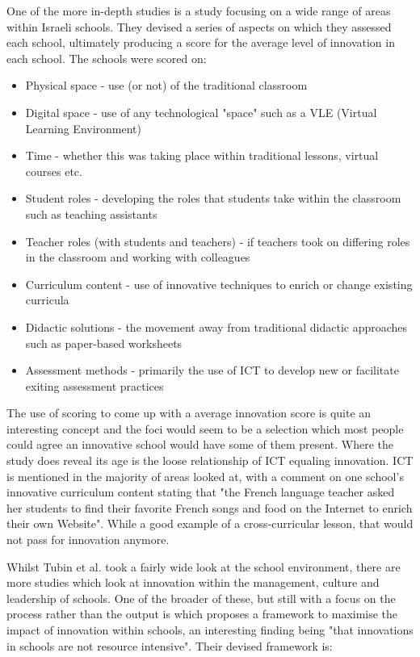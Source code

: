 One of the more in-depth studies is a study focusing on a wide range of areas within Israeli schools. \cite{tubin2003domains} They devised a series of aspects on which they assessed each school, ultimately producing a score for the average level of innovation in each school. The schools were scored on:

\begin{itemize}
\item Physical space - use (or not) of the traditional classroom
\item Digital space - use of any technological "space" such as a VLE (Virtual Learning Environment)
\item Time - whether this was taking place within traditional lessons, virtual courses etc.
\item Student roles - developing the roles that students take within the classroom such as teaching assistants
\item Teacher roles (with students and teachers) - if teachers took on differing roles in the classroom and working with colleagues
\item Curriculum content - use of innovative techniques to enrich or change existing curricula
\item Didactic solutions - the movement away from traditional didactic approaches such as paper-based worksheets
\item Assessment methods - primarily the use of ICT to develop new or facilitate exiting assessment practices
\end{itemize}

The use of scoring to come up with a average innovation score is quite an interesting concept and the foci would seem to be a selection which most people could agree an innovative school would have some of them present. Where the study does reveal its age is the loose relationship of ICT equaling innovation. ICT is mentioned in the majority of areas looked at, with a comment on one school's innovative curriculum content stating that "the French language teacher asked her students to find their favorite French songs and food on the Internet to enrich their own Website". While a good example of a cross-curricular lesson, that would not pass for innovation anymore.

Whilst Tubin et al. took a fairly wide look at the school environment, there are more studies which look at innovation within the management, culture and leadership of schools. One of the broader of these, but still with a focus on the process rather than the output is \cite{Sharma_2005} which proposes a framework to maximise the impact of innovation within schools, an interesting finding being "that innovations in schools are not resource intensive". Their devised framework is:

